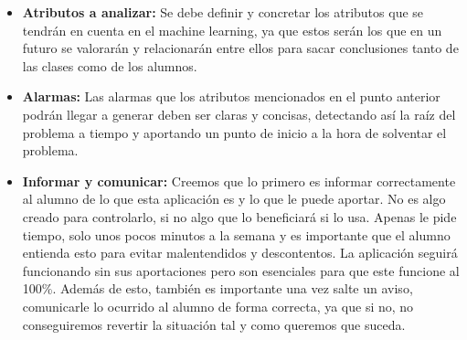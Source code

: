 \begin{itemize}
\item \textbf{Atributos a analizar:} Se debe definir y concretar los
  atributos que se tendrán en cuenta en el machine learning, ya que
  estos serán los que en un futuro se valorarán y relacionarán entre
  ellos para sacar conclusiones tanto de las clases como de los
  alumnos.

\item \textbf{Alarmas:} Las alarmas que los atributos mencionados en
  el punto anterior podrán llegar a generar deben ser claras y
  concisas, detectando así la raíz del problema a tiempo y aportando
  un punto de inicio a la hora de solventar el problema.

\item \textbf{Informar y comunicar:} Creemos que lo primero es
  informar correctamente al alumno de lo que esta aplicación es y lo
  que le puede aportar. No es algo creado para controlarlo, si no algo
  que lo beneficiará si lo usa. Apenas le pide tiempo, solo unos pocos
  minutos a la semana y es importante que el alumno entienda esto para
  evitar malentendidos y descontentos. La aplicación seguirá
  funcionando sin sus aportaciones pero son esenciales para que este
  funcione al 100\%. Además de esto, también es importante una vez
  salte un aviso, comunicarle lo ocurrido al alumno de forma correcta,
  ya que si no, no conseguiremos revertir la situación tal y como
  queremos que suceda.

\nocite{marcoPedagogico}\nocite{hezkuntzaEreduArdatzak}\nocite{metodologiaParticipativa}\nocite{aprendizajeBasadoEnProblemas}\nocite{profesorUniversitario}\nocite{modeloUniversitario}

\end{itemize}
